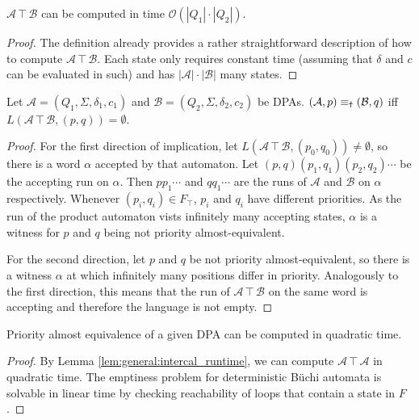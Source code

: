 \begin{lem}
	$\mathcal{A} \intercal \mathcal{B}$ can be computed in time $\mathcal{O}(|Q_1| \cdot |Q_2|)$.
	\label{lem:general:intercal_runtime}
\end{lem}

\begin{proof}
	The definition already provides a rather straightforward description of how to compute $\mathcal{A} \intercal \mathcal{B}$. Each state only requires constant time (assuming that $\delta$ and $c$ can be evaluated in such) and has $|\mathcal{A}| \cdot |\mathcal{B}|$ many states.
\end{proof}

\begin{lem}
	Let $\mathcal{A} = (Q_1, \Sigma, \delta_1, c_1)$ and $\mathcal{B} = (Q_2, \Sigma, \delta_2, c_2)$ be DPAs. $(\mathcal{A}, p) \equiv_\text{\Ankh} (\mathcal{B}, q)$ iff $L(\mathcal{A} \intercal \mathcal{B}, (p, q)) = \emptyset$. 
	\label{lem:general:intercal_prioalmostequiv}
\end{lem}

\begin{proof}
	For the first direction of implication, let $L(\mathcal{A} \intercal \mathcal{B}, (p_0, q_0)) \neq \emptyset$, so there is a word $\alpha$ accepted by that automaton. Let $(p, q) (p_1, q_1) (p_2, q_2) \cdots$ be the accepting run on $\alpha$. Then $p p_1 \cdots$ and $q q_1 \cdots$ are the runs of $\mathcal{A}$ and $\mathcal{B}$ on $\alpha$ respectively. Whenever $(p_i, q_i) \in F_\intercal$, $p_i$ and $q_i$ have different priorities. As the run of the product automaton vists infinitely many accepting states, $\alpha$ is a witness for $p$ and $q$ being not priority almost-equivalent.
	
	For the second direction, let $p$ and $q$ be not priority almost-equivalent, so there is a witness $\alpha$ at which infinitely many positions differ in priority. Analogously to the first direction, this means that the run of $\mathcal{A} \intercal \mathcal{B}$ on the same word is accepting and therefore the language is not empty.
\end{proof}

\begin{cor}
	Priority almost equivalence of a given DPA can be computed in quadratic time.
\end{cor}

\begin{proof}
	By Lemma \ref{lem:general:intercal_runtime}, we can compute $\mathcal{A} \intercal \mathcal{A}$ in quadratic time. The emptiness problem for deterministic B\"uchi automata is solvable in linear time by checking reachability of loops that contain a state in $F$. 
\end{proof}

